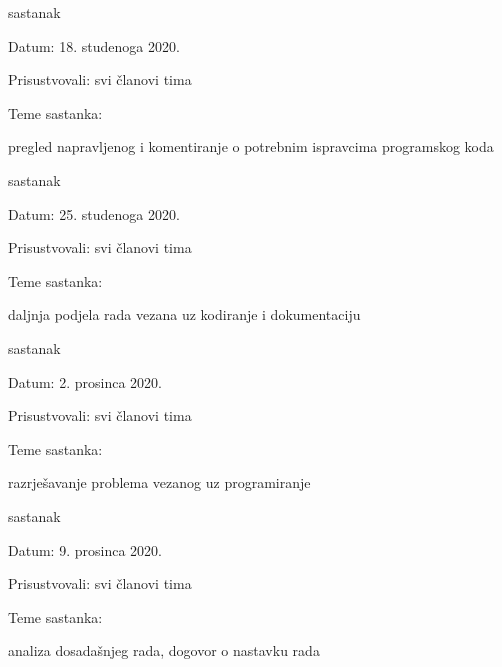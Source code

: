 \begin{packed_enum}
			\item  sastanak
			\item[] \begin{packed_item}
				\item Datum: 18. studenoga 2020. 
				\item Prisustvovali: svi članovi tima
				\item Teme sastanka:
				\begin{packed_item}
					\item  pregled napravljenog i komentiranje o potrebnim ispravcima programskog koda
				\end{packed_item}
			\end{packed_item}
			
			\item  sastanak
			\item[] \begin{packed_item}
				\item Datum: 25. studenoga 2020. 
				\item Prisustvovali: svi članovi tima
				\item Teme sastanka:
				\begin{packed_item}
					\item  daljnja podjela rada vezana uz kodiranje i dokumentaciju
				\end{packed_item}
			\end{packed_item}
			
			\item  sastanak
			\item[] \begin{packed_item}
				\item Datum: 2. prosinca 2020. 
				\item Prisustvovali: svi članovi tima
				\item Teme sastanka:
				\begin{packed_item}
					\item  razrješavanje problema vezanog uz programiranje
				\end{packed_item}
			\end{packed_item}
			
			\item  sastanak
			\item[] \begin{packed_item}
				\item Datum: 9. prosinca 2020. 
				\item Prisustvovali: svi članovi tima
				\item Teme sastanka:
				\begin{packed_item}
					\item  analiza dosadašnjeg rada, dogovor o nastavku rada
				\end{packed_item}
			\end{packed_item}
			

\end{packed_enum}
